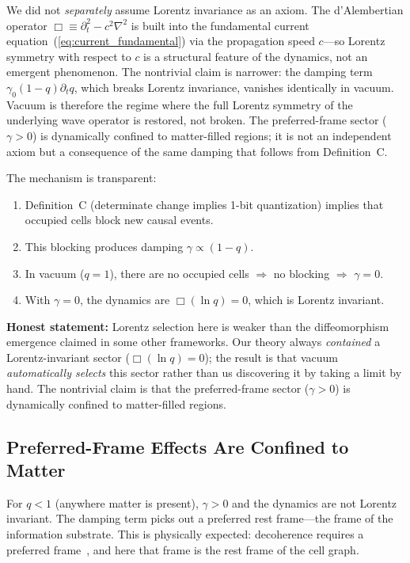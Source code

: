 \documentclass[aps,prd,twocolumn,showpacs,superscriptaddress,preprintnumbers]{revtex4-2}
\begin{document}
We did not \emph{separately} assume Lorentz invariance as an axiom.
The d'Alembertian operator $\Box \equiv \partial_t^2 - c^2\nabla^2$ is built into the fundamental current equation~(\ref{eq:current_fundamental}) via the propagation speed $c$---so Lorentz symmetry with respect to $c$ is a structural feature of the dynamics, not an emergent phenomenon.
The nontrivial claim is narrower: the damping term $\gamma_0(1-q)\partial_t q$, which breaks Lorentz invariance, vanishes identically in vacuum.
Vacuum is therefore the regime where the full Lorentz symmetry of the underlying wave operator is restored, not broken.
The preferred-frame sector ($\gamma>0$) is dynamically confined to matter-filled regions; it is not an independent axiom but a consequence of the same damping that follows from Definition~C.

The mechanism is transparent:
\begin{enumerate}
    \item Definition~C (determinate change implies 1-bit quantization) implies that occupied cells block new causal events.
    \item This blocking produces damping $\gamma\propto(1-q)$.
    \item In vacuum ($q=1$), there are no occupied cells $\Rightarrow$ no blocking $\Rightarrow$ $\gamma=0$.
    \item With $\gamma=0$, the dynamics are $\Box(\ln q)=0$, which is Lorentz invariant.
\end{enumerate}

\textbf{Honest statement:} Lorentz selection here is weaker than the diffeomorphism emergence claimed in some other frameworks.
Our theory always \emph{contained} a Lorentz-invariant sector ($\Box(\ln q)=0$); the result is that vacuum \emph{automatically selects} this sector rather than us discovering it by taking a limit by hand.
The nontrivial claim is that the preferred-frame sector ($\gamma>0$) is dynamically confined to matter-filled regions.

\subsection{Preferred-Frame Effects Are Confined to Matter}

For $q<1$ (anywhere matter is present), $\gamma>0$ and the dynamics are not Lorentz invariant.
The damping term picks out a preferred rest frame---the frame of the information substrate.
This is physically expected: decoherence requires a preferred frame~\cite{Bassi:2013mta}, and here that frame is the rest frame of the cell graph.
\end{document}
